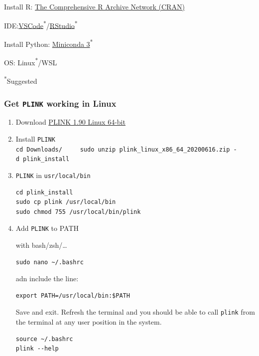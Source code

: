 Install R: \href{https://cran.r-project.org/}{The Comprehensive R
Archive Network (CRAN)}

IDE:\href{https://code.visualstudio.com/}{VSCode}\textsuperscript{*}/\href{https://posit.co/download/}{RStudio}\textsuperscript{*}

Install Python:
\href{https://docs.anaconda.com/free/miniconda/index.html}{Miniconda
3}\textsuperscript{*}

OS: Linux\textsuperscript{*}/WSL

\textsuperscript{*}Suggested

\hypertarget{get-plink-working-in-linux}{%
\subsubsection{\texorpdfstring{Get \texttt{PLINK} working in
Linux}{Get PLINK working in Linux}}\label{get-plink-working-in-linux}}

\begin{enumerate}
\def\labelenumi{\arabic{enumi}.}
\item
  Download
  \href{https://s3.amazonaws.com/plink1-assets/plink_linux_x86_64_20231211.zip}{PLINK
  1.90 Linux 64-bit}
\item
  Install \texttt{PLINK}
  \texttt{cd\ Downloads/\ \ \ \ \ sudo\ unzip\ plink\_linux\_x86\_64\_20200616.zip\ -d\ plink\_install}
\item
  \texttt{PLINK} in \texttt{usr/local/bin}

\begin{verbatim}
cd plink_install
sudo cp plink /usr/local/bin
sudo chmod 755 /usr/local/bin/plink
\end{verbatim}
\item
  Add \texttt{PLINK} to PATH

  with bash/zsh/\ldots{}

\begin{verbatim}
sudo nano ~/.bashrc
\end{verbatim}

  adn include the line:

\begin{verbatim}
export PATH=/usr/local/bin:$PATH
\end{verbatim}

  Save and exit. Refresh the terminal and you should be able to call
  \texttt{plink} from the terminal at any user position in the system.

\begin{verbatim}
source ~/.bashrc
plink --help
\end{verbatim}
\end{enumerate}

